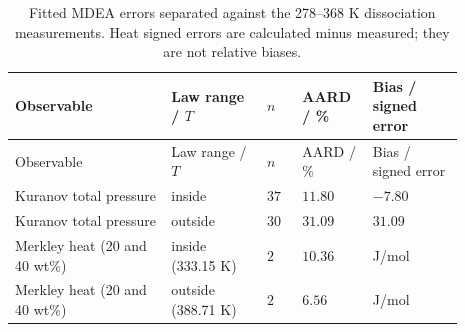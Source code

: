 \begingroup\small\setlength{\tabcolsep}{3pt}
\begin{longtable}{@{}>{\raggedright\arraybackslash}p{0.31\linewidth}>{\raggedright\arraybackslash}p{0.19\linewidth}>{\raggedright\arraybackslash}p{0.07\linewidth}>{\raggedright\arraybackslash}p{0.14\linewidth}>{\raggedright\arraybackslash}p{0.18\linewidth}@{}}
\caption{Fitted MDEA errors separated against the 278--368 K dissociation measurements. Heat signed errors are calculated minus measured; they are not relative biases.}\label{tab:p2-mdea-range}\\
\toprule Observable & Law range / $T$ & $n$ & AARD / \% & Bias / signed error \\ \midrule\endfirsthead
\toprule Observable & Law range / $T$ & $n$ & AARD / \% & Bias / signed error \\ \midrule\endhead
\bottomrule\endfoot
Kuranov total pressure & inside & $37$ & $11.80$ & $-7.80$ \\
Kuranov total pressure & outside & $30$ & $31.09$ & $31.09$ \\
Merkley heat (20 and 40 wt\%) & inside (333.15 K) & $2$ & $10.36$ & -5725 J/mol \\
Merkley heat (20 and 40 wt\%) & outside (388.71 K) & $2$ & $6.56$ & -3989 J/mol \\
\end{longtable}\endgroup
